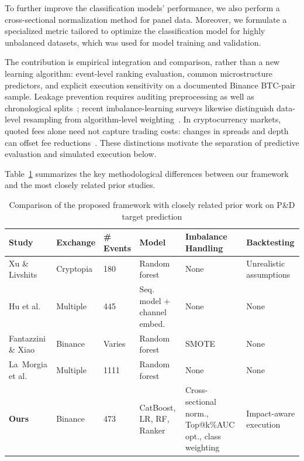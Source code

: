\documentclass{ieeeaccess}
\begin{document}
To further improve the classification models' performance, we also perform a cross-sectional normalization method for panel data. Moreover, we formulate a specialized metric tailored to optimize the classification model for highly unbalanced datasets, which was used for model training and validation.

\textcolor{revisionblue}{The contribution is empirical integration and comparison, rather than a new learning algorithm: event-level ranking evaluation, common microstructure predictors, and explicit execution sensitivity on a documented Binance BTC-pair sample. Leakage prevention requires auditing preprocessing as well as chronological splits~\cite{kapoor2023leakage,cerqueira2020evaluation}; recent imbalance-learning surveys likewise distinguish data-level resampling from algorithm-level weighting~\cite{chen2024imbalance}. In cryptocurrency markets, quoted fees alone need not capture trading costs: changes in spreads and depth can offset fee reductions~\cite{galati2024fees}. These distinctions motivate the separation of predictive evaluation and simulated execution below.}

Table~\ref{table:comparison_prior_work} summarizes the key methodological differences between our framework and the most closely related prior studies.

\begin{table}[!tbp]
    \centering
    \small
    \renewcommand{\arraystretch}{1.3}
    \setlength{\tabcolsep}{5pt}
    \caption{Comparison of the proposed framework with closely related prior work on P\&D target prediction}
    \begin{tabular}{p{2.8cm}p{2.2cm}p{2cm}p{2.2cm}p{2.5cm}p{2.5cm}}
        \toprule
        \textbf{Study} & \textbf{Exchange} & \textbf{\# Events} & \textbf{Model} & \textbf{Imbalance Handling} & \textbf{Backtesting} \\
        \midrule
        Xu \& Livshits~\cite{pd_anatomy} & Cryptopia & 180 & Random forest & None & Unrealistic assumptions \\
        Hu et al.~\cite{hu2023sequence} & Multiple & 445 & Seq. model + channel embed. & None & None \\
        Fantazzini \& Xiao~\cite{econometrics11030022} & Binance & Varies & Random forest & SMOTE & None \\
        La~Morgia et al.~\cite{la_morgia_pump_2020} & Multiple & 1111 & Random forest & None & None \\
        \textbf{Ours} & Binance & 473 & CatBoost, LR, RF, Ranker & Cross-sectional norm., Top@k\%AUC opt., class weighting & Impact-aware execution \\
        \bottomrule
    \end{tabular}
    \label{table:comparison_prior_work}
\end{table}
\end{document}
